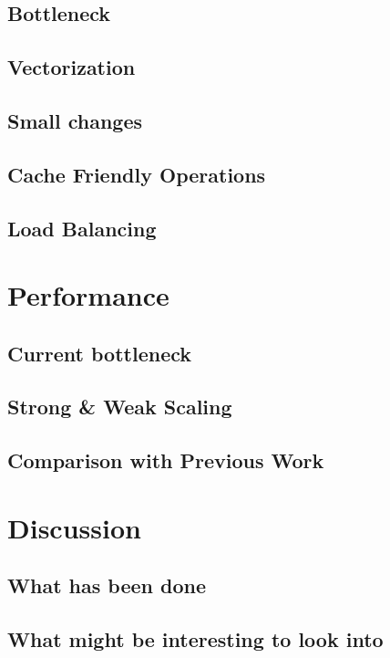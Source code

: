 \documentclass[a4paper,11pt]{article}
\begin{document}
\begin{multicols}{2}
	\subsection{Bottleneck}
	\subsection{Vectorization}
	\subsection{Small changes}
	\subsection{Cache Friendly Operations}
	\subsection{Load Balancing}
\section{Performance}
	\subsection{Current bottleneck}
	\subsection{Strong \& Weak Scaling}
	\subsection{Comparison with Previous Work}
\section{Discussion}
	\subsection{What has been done}
	\subsection{What might be interesting to look into}
\end{multicols}
\begin{verbatim}

\end{verbatim}
\end{document}
